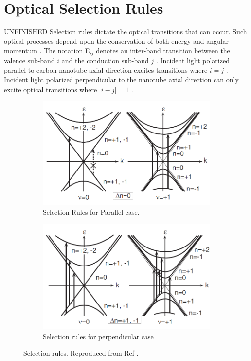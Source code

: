 \section{Optical Selection Rules}

{\color{red}UNFINISHED} Selection rules dictate the optical transitions that can occur. Such optical processes depend upon the conservation of both energy and angular momentum \cite{weismanKonoBook}. The notation E$_{ij}$ denotes an inter-band transition between the valence sub-band $i$ and the conduction sub-band $j$ \cite{weismanKonoBook}. Incident light polarized parallel to carbon nanotube axial direction excites transitions where $i=j$ \cite{weismanKonoBook}. Incident light polarized perpendicular to the nanotube axial direction can only excite optical transitions where $|i-j|=1$ \cite{weismanKonoBook}. 


\begin{figure}[H]
	\centering
	\begin{subfigure}{\textwidth}
		\centering
		\includegraphics[scale=0.7]{images/chapter_optical_props/selection_rules_1.png}
		\caption{Selection Rules for Parallel case.}
	\end{subfigure}
	\begin{subfigure}{\textwidth}
		\centering
		\includegraphics[scale=0.7]{images/chapter_optical_props/selection_rules_2.png}
		\caption{Selection rules for perpendicular case}
	\end{subfigure}
	\caption{Selection rules. Reproduced from Ref \cite{ando2005theory}.}
	\label{fig:selection_rules}
\end{figure}

